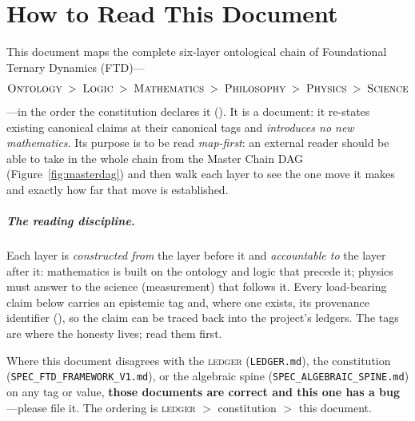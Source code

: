 \chapter*{How to Read This Document}

\noindent
This document maps the complete six-layer ontological chain of Foundational
Ternary Dynamics (FTD)---
\[
  \textsc{Ontology} \;>\; \textsc{Logic} \;>\; \textsc{Mathematics}
  \;>\; \textsc{Philosophy} \;>\; \textsc{Physics} \;>\; \textsc{Science}
\]
---in the order the constitution declares it (). It is a
 document: it re-states existing canonical claims at their canonical
tags and \emph{introduces no new mathematics}. Its purpose is to be read
\emph{map-first}: an external reader should be able to take in the whole chain
from the Master Chain DAG (Figure~\ref{fig:masterdag}) and then walk each layer
to see the one move it makes and exactly how far that move is established.

\paragraph{The reading discipline.} Each layer is \emph{constructed from} the
layer before it and \emph{accountable to} the layer after it: mathematics is
built on the ontology and logic that precede it; physics must answer to the
science (measurement) that follows it. Every load-bearing claim below carries an
epistemic tag and, where one exists, its provenance identifier (),
so the claim can be traced back into the project's ledgers. The tags are where
the honesty lives; read them first.

\begin{conditionalbox}
Where this document disagrees with the \textsc{ledger}
(\texttt{LEDGER.md}), the constitution (\texttt{SPEC\_FTD\_FRAMEWORK\_V1.md}), or
the algebraic spine (\texttt{SPEC\_ALGEBRAIC\_SPINE.md}) on any tag or value,
\textbf{those documents are correct and this one has a bug}---please file it.
The ordering is \textsc{ledger} $>$ constitution $>$ this document.
\end{conditionalbox}

